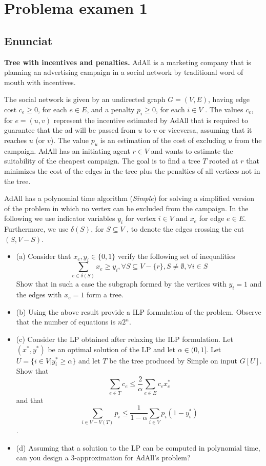 \section{Problema examen 1}
\subsection{Enunciat}
\textbf{Tree with incentives and penalties.} AdAll is a marketing company that is planning an advertising campaign in a social network by traditional word of mouth with incentives. 

The social network is given by an undirected graph $G = (V,E)$, having edge cost $c_e \geq 0$, for each $e \in E$, and a penalty $p_i \geq 0$, for each $i \in V$ . The values $c_e$, for $e = (u,v)$ represent the incentive estimated by AdAll that is required to guarantee that the ad will be passed from $u$ to $v$ or viceversa, assuming that it reaches $u$ (or $v$). The value $p_u$ is an estimation of the cost of excluding $u$ from the campaign. AdAll has an initiating agent $r \in V$ and wants to estimate the suitability of the cheapest campaign. The goal is to find a tree $T$ rooted at $r$ that minimizes the cost of the edges in the tree plus the penalties of all vertices not in the tree.

AdAll has a polynomial time algorithm (\textit{Simple}) for solving a simplified version of the problem in which no vertex can be excluded from the campaign. In the following we use indicator variables $y_i$ for vertex $i \in V$ and $x_e$ for edge $e \in E$. Furthermore, we use $\delta(S)$, for $S \subseteq V$ , to denote the edges crossing the cut $(S,V-S)$. 

\begin{itemize}
    \item (a) Consider that $x_e,y_i \in \{0,1\}$ verify the following set of inequalities 
    \[
    \sum_{e \in \delta(S)}x_e \ge y_i,  \forall S \subseteq V -\{r\},S \neq \emptyset,\forall i \in S
    \] 
    Show that in such a case the subgraph formed by the vertices with $y_i = 1$ and the edges with $x_e  = 1$ form a tree. 
    \item (b) Using the above result provide a ILP formulation of the problem. Observe that the number of equations is $n2^n$. 
    \item (c) Consider the LP obtained after relaxing the ILP formulation. Let $(x^{*},y^{*})$ be an optimal solution of the LP and let $\alpha \in (0,1]$. Let $U = \{i \in V | y^{*}_i \geq \alpha\}$ and let $T$ be the tree produced by Simple on input $G[U]$. Show that 
    \[
    \sum_{e\in T} c_e \leq \frac{2}{\alpha} \sum_{e\in E} c_e x^{*}_e
    \] 
    and that 
    \[
    \sum_{i \in V-V(T)} p_i \leq \frac{1}{1-\alpha} \sum_{i \in V}p_i(1-y^{*}_i)
    \]. 
    \item (d) Assuming that a solution to the LP can be computed in polynomial time, can you design a 3-approximation for AdAll’s problem?
\end{itemize}

